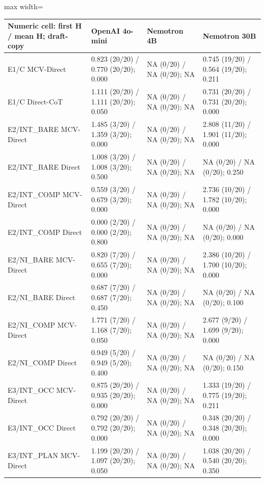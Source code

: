 \documentclass[11pt,a4paper]{article}
\begin{document}
\begin{center}\begingroup\small\setlength{\tabcolsep}{4.5pt}\renewcommand{\arraystretch}{1.12}\begin{adjustbox}{max width=\textwidth}\begin{tabular}{llll}\toprule
\textbf{Numeric cell: first H / mean H; draft-copy} & \textbf{OpenAI 4o-mini} & \textbf{Nemotron 4B} & \textbf{Nemotron 30B} \\ \midrule
E1/C MCV-Direct & 0.823 (20/20) / 0.770 (20/20); 0.000 & NA (0/20) / NA (0/20); NA & 0.745 (19/20) / 0.564 (19/20); 0.211 \\
E1/C Direct-CoT & 1.111 (20/20) / 1.111 (20/20); 0.050 & NA (0/20) / NA (0/20); NA & 0.731 (20/20) / 0.731 (20/20); 0.000 \\
E2/INT\_\allowbreak{}BARE MCV-Direct & 1.485 (3/20) / 1.359 (3/20); 0.000 & NA (0/20) / NA (0/20); NA & 2.808 (11/20) / 1.901 (11/20); 0.000 \\
E2/INT\_\allowbreak{}BARE Direct & 1.008 (3/20) / 1.008 (3/20); 0.500 & NA (0/20) / NA (0/20); NA & NA (0/20) / NA (0/20); 0.250 \\
E2/INT\_\allowbreak{}COMP MCV-Direct & 0.559 (3/20) / 0.679 (3/20); 0.000 & NA (0/20) / NA (0/20); NA & 2.736 (10/20) / 1.782 (10/20); 0.000 \\
E2/INT\_\allowbreak{}COMP Direct & 0.000 (2/20) / 0.000 (2/20); 0.800 & NA (0/20) / NA (0/20); NA & NA (0/20) / NA (0/20); 0.000 \\
E2/NI\_\allowbreak{}BARE MCV-Direct & 0.820 (7/20) / 0.655 (7/20); 0.000 & NA (0/20) / NA (0/20); NA & 2.386 (10/20) / 1.700 (10/20); 0.000 \\
E2/NI\_\allowbreak{}BARE Direct & 0.687 (7/20) / 0.687 (7/20); 0.450 & NA (0/20) / NA (0/20); NA & NA (0/20) / NA (0/20); 0.100 \\
E2/NI\_\allowbreak{}COMP MCV-Direct & 1.771 (7/20) / 1.168 (7/20); 0.050 & NA (0/20) / NA (0/20); NA & 2.677 (9/20) / 1.699 (9/20); 0.000 \\
E2/NI\_\allowbreak{}COMP Direct & 0.949 (5/20) / 0.949 (5/20); 0.400 & NA (0/20) / NA (0/20); NA & NA (0/20) / NA (0/20); 0.150 \\
E3/INT\_\allowbreak{}OCC MCV-Direct & 0.875 (20/20) / 0.935 (20/20); 0.000 & NA (0/20) / NA (0/20); NA & 1.333 (19/20) / 0.775 (19/20); 0.211 \\
E3/INT\_\allowbreak{}OCC Direct & 0.792 (20/20) / 0.792 (20/20); 0.000 & NA (0/20) / NA (0/20); NA & 0.348 (20/20) / 0.348 (20/20); 0.000 \\
E3/INT\_\allowbreak{}PLAN MCV-Direct & 1.199 (20/20) / 1.097 (20/20); 0.050 & NA (0/20) / NA (0/20); NA & 1.038 (20/20) / 0.540 (20/20); 0.350 \\

\end{tabular}
\end{adjustbox}
\end{center}
\end{document}
